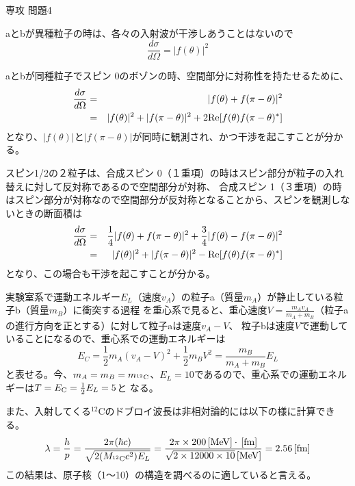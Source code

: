 \documentclass[fleqn]{jbook}
\begin{document}
\begin{answer}{専攻 問題4}{}

\begin{subanswers}
\SubAnswer
\begin{subsubanswers}
\SubSubAnswer
aとbが異種粒子の時は、各々の入射波が干渉しあうことはないので
\[
\frac{d\sigma}{d\Omega}=|f(\theta)|^2
\]

\SubSubAnswer
aとbが同種粒子でスピン 0のボゾンの時、空間部分に対称性を持たせるために、
\begin{eqnarray*}
\frac{d\sigma}{d\Omega}&=&|f(\theta)+f(\pi-\theta)|^2\\
                       &=&|f(\theta)|^2+|f(\pi-\theta)|^2+2{\rm{Re}}[f(\theta)f(\pi-\theta)^{*}]
\end{eqnarray*}
となり、$|f(\theta)|$と$|f(\pi-\theta)|$が同時に観測され、かつ干渉を起こすことが分かる。

\SubSubAnswer
スピン1/2の２粒子は、合成スピン 0（１重項）の時はスピン部分が粒子の入れ替えに対して反対称であるので空間部分が対称、
合成スピン 1（３重項）の時はスピン部分が対称なので空間部分が反対称となることから、スピンを観測しないときの断面積は
\begin{eqnarray*}
\frac{d\sigma}{d\Omega}&=&\frac{1}{4}|f(\theta)+f(\pi-\theta)|^2+\frac{3}{4}|f(\theta)-f(\pi-\theta)|^2\\
                       &=&|f(\theta)|^2+|f(\pi-\theta)|^2-{\rm{Re}}[f(\theta)f(\pi-\theta)^{*}]
\end{eqnarray*}
となり、この場合も干渉を起こすことが分かる。

\end{subsubanswers}

\SubAnswer

\begin{subsubanswers}
\SubSubAnswer

実験室系で運動エネルギー$E_{L}$（速度$v_A$）の粒子a（質量$m_A$）が静止している粒子b（質量$m_B$）に衝突する過程
を重心系で見ると、重心速度$V=\frac{m_A v_A}{m_A+m_B}$（粒子aの進行方向を正とする）に対して粒子aは速度$v_A-V$、
粒子bは速度$V$で運動していることになるので、重心系での運動エネルギーは
\[
E_C=\frac{1}{2}m_A (v_A-V)^2+\frac{1}{2}m_B V^2=\frac{m_B}{m_A+m_B}E_L
\]
と表せる。今、$m_A=m_B=m_{^{12}{\rm{C}}}$、$E_L=10${\Unit{[MeV]}}であるので、重心系での運動エネルギーは$T=E_{\rm{C}}=\frac{1}{2}E_L=5${\Unit{[MeV]}}と
なる。

また、入射してくる$^{12}${\rm{C}}のドブロイ波長は非相対論的には以下の様に計算できる。
\[
\lambda=\frac{h}{p}=\frac{2\pi(\hbar c)}{\sqrt{2(M_{^{12}{\rm{C}}}c^2) E_L}}=\frac{2\pi\times 200{\,{\rm [MeV]}}\cdot {\,{\rm [fm]}}}{\sqrt{2\times 12000\times 10}{\,{\rm [MeV]}}}
=2.56{\,{\rm [fm]}}
\]
この結果は、原子核（1〜10{\Unit{[fm]}}）の構造を調べるのに適していると言える。


\end{subsubanswers}
\end{subanswers}
\end{answer}
\end{document}
